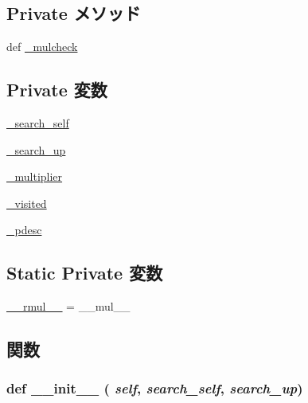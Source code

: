 \subsection*{Private メソッド}
\begin{DoxyCompactItemize}
\item 
def \hyperlink{classm5_1_1proxy_1_1BaseProxy_a246216733f8117412cd0937090e28462}{\_\-mulcheck}
\end{DoxyCompactItemize}
\subsection*{Private 変数}
\begin{DoxyCompactItemize}
\item 
\hyperlink{classm5_1_1proxy_1_1BaseProxy_a8ee9ef0264b467147308cb0e8a87b3ee}{\_\-search\_\-self}
\item 
\hyperlink{classm5_1_1proxy_1_1BaseProxy_afcc0d66e9e374da3917dadaa5c984ace}{\_\-search\_\-up}
\item 
\hyperlink{classm5_1_1proxy_1_1BaseProxy_a395bed3d7605ce5916de64e3c6f22764}{\_\-multiplier}
\item 
\hyperlink{classm5_1_1proxy_1_1BaseProxy_af4f0faeb1c76ab133e93d9e55a79260f}{\_\-visited}
\item 
\hyperlink{classm5_1_1proxy_1_1BaseProxy_a05a816c49bf97cfd73787b8929ee2be6}{\_\-pdesc}
\end{DoxyCompactItemize}
\subsection*{Static Private 変数}
\begin{DoxyCompactItemize}
\item 
\hyperlink{classm5_1_1proxy_1_1BaseProxy_a0d6f9f52e4ec8af916d462d238cd25b1}{\_\-\_\-rmul\_\-\_\-} = \_\-\_\-mul\_\-\_\-
\end{DoxyCompactItemize}


\subsection{関数}
\hypertarget{classm5_1_1proxy_1_1BaseProxy_ac775ee34451fdfa742b318538164070e}{
\subsubsection[{\_\-\_\-init\_\-\_\-}]{\setlength{\rightskip}{0pt plus 5cm}def \_\-\_\-init\_\-\_\- ( {\em self}, \/   {\em search\_\-self}, \/   {\em search\_\-up})}}
\label{classm5_1_1proxy_1_1BaseProxy_ac775ee34451fdfa742b318538164070e}



